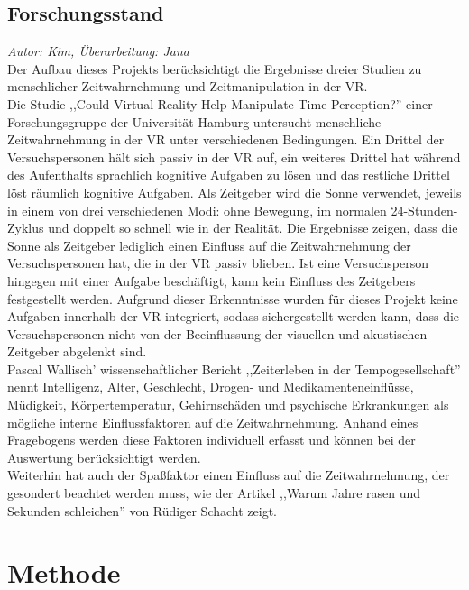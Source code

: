 \documentclass{Paper}
\begin{document}
\subsection{Forschungsstand}
\textit{Autor: Kim, Überarbeitung: Jana}\\
Der Aufbau dieses Projekts berücksichtigt die Ergebnisse dreier Studien zu menschlicher Zeitwahrnehmung und Zeitmanipulation in der VR.\\
Die Studie ,,Could Virtual Reality Help Manipulate Time Perception?'' einer Forschungsgruppe der Universität Hamburg untersucht menschliche Zeitwahrnehmung in der VR unter verschiedenen Bedingungen. Ein Drittel der Versuchspersonen hält sich passiv in der VR auf, ein weiteres Drittel hat während des Aufenthalts sprachlich kognitive Aufgaben zu lösen und das restliche Drittel löst räumlich kognitive Aufgaben. 
Als Zeitgeber wird die Sonne verwendet, jeweils in einem von drei verschiedenen Modi: ohne Bewegung, im normalen 24-Stunden-Zyklus und doppelt so schnell wie in der Realität. Die Ergebnisse zeigen, dass die Sonne als Zeitgeber lediglich einen Einfluss auf die Zeitwahrnehmung der Versuchspersonen hat, die in der VR passiv blieben. Ist eine Versuchsperson hingegen mit einer Aufgabe beschäftigt, kann kein Einfluss des Zeitgebers festgestellt werden.\cite{DeviceSystems2016}
Aufgrund dieser Erkenntnisse wurden für dieses Projekt keine Aufgaben innerhalb der VR integriert, sodass sichergestellt werden kann, dass die Versuchspersonen nicht von der Beeinflussung der visuellen und akustischen Zeitgeber abgelenkt sind.\\
Pascal Wallisch' wissenschaftlicher Bericht ,,Zeiterleben in der Tempogesellschaft'' nennt Intelligenz, Alter, Geschlecht, Drogen- und Medikamenteneinflüsse, Müdigkeit, Körpertemperatur, Gehirnschäden und psychische Erkrankungen als mögliche interne Einflussfaktoren auf die Zeitwahrnehmung.\cite{Wallisch2003} 
Anhand eines Fragebogens werden diese Faktoren individuell erfasst und können bei der Auswertung berücksichtigt werden.\\
Weiterhin hat auch der Spaßfaktor einen Einfluss auf die Zeitwahrnehmung, der gesondert beachtet werden muss, wie der Artikel ,,Warum Jahre rasen und Sekunden schleichen'' von Rüdiger Schacht zeigt. \cite{Welt24}

\clearpage
\section{Methode}
\end{document}

